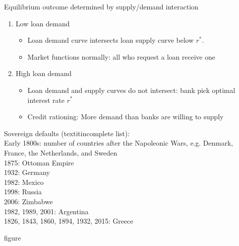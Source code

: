 \documentclass{beamer}
\begin{document}
\begin{frame}
 Equilibrium outcome determined by supply/demand interaction
\begin{enumerate}
  \item Low loan demand
  \begin{itemize}
    \item Loan demand curve intersects loan supply curve below $r^*$. 
    \item Market functions normally: all who request a loan receive one
\end{itemize}
  \item High loan demand
  \begin{itemize}
    \item Loan demand and supply curves do not intersect: bank pick optimal interest rate $r^*$    
    \item Credit rationing: More demand than banks are willing to supply
  \end{itemize}
\end{enumerate}
\end{frame}

\begin{frame}
 Sovereign defaults (textit{incomplete list}):\\
 \medskip
 Early 1800s: number of countries after the Napoleonic Wars, e.g. Denmark, France, the Netherlands, and Sweden\\
 1875: Ottoman Empire\\
 1932: Germany\\
 1982: Mexico\\
 1998: Russia\\
 2006: Zimbabwe\\
 1982, 1989, 2001: Argentina\\
 1826, 1843, 1860, 1894, 1932, 2015: Greece
\end{frame}

\begin{frame}
figure 
\end{frame}
\end{document}
